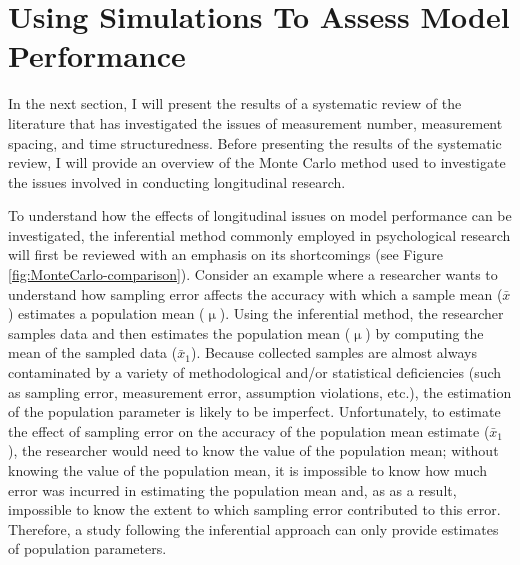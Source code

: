 \documentclass[
12pt, %
twoside,
english]{guelphthesis}
\begin{document}
\hypertarget{using-simulations-to-assess-model-performance}{%
\section{Using Simulations To Assess Model Performance}\label{using-simulations-to-assess-model-performance}}

In the next section, I will present the results of a systematic review of the literature that has investigated the issues of measurement number, measurement spacing, and time structuredness. Before presenting the results of the systematic review, I will provide an overview of the Monte Carlo method used to investigate the issues involved in conducting longitudinal research.

To understand how the effects of longitudinal issues on model performance can be investigated, the inferential method commonly employed in psychological research will first be reviewed with an emphasis on its shortcomings (see Figure \ref{fig:MonteCarlo-comparison}). Consider an example where a researcher wants to understand how sampling error affects the accuracy with which a sample mean (\(\bar{x}\)) estimates a population mean (\(\upmu\)). Using the inferential method, the researcher samples data and then estimates the population mean (\(\upmu\)) by computing the mean of the sampled data (\(\bar{x}_1\)). Because collected samples are almost always contaminated by a variety of methodological and/or statistical deficiencies (such as sampling error, measurement error, assumption violations, etc.), the estimation of the population parameter is likely to be imperfect. Unfortunately, to estimate the effect of sampling error on the accuracy of the population mean estimate (\(\bar{x}_1\)), the researcher would need to know the value of the population mean; without knowing the value of the population mean, it is impossible to know how much error was incurred in estimating the population mean and, as as a result, impossible to know the extent to which sampling error contributed to this error. Therefore, a study following the inferential approach can only provide estimates of population parameters.
\end{document}
